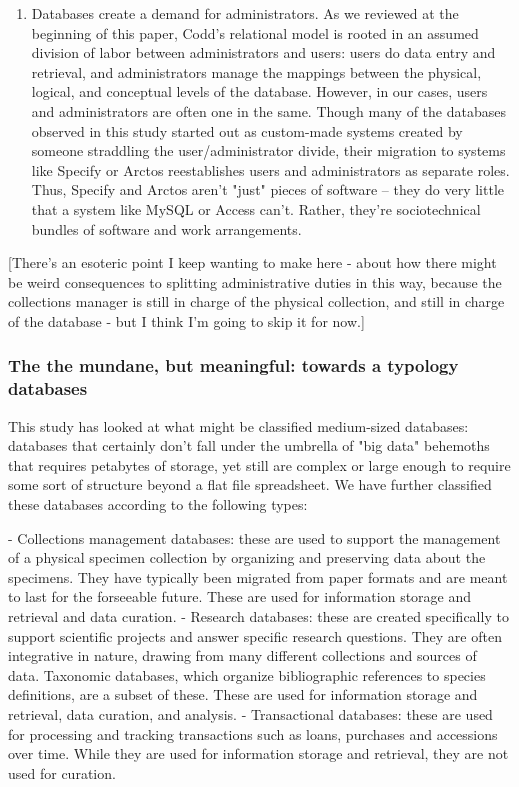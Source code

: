 \begin{enumerate}
\item Databases create a demand for administrators. As we reviewed at the beginning of this paper, Codd’s relational model is rooted in an assumed division of labor between administrators and users: users do data entry and retrieval, and administrators manage the mappings between the physical, logical, and conceptual levels of the database. However, in our cases, users and administrators are often one in the same. Though many of the databases observed in this study started out as custom-made systems created by someone straddling the user/administrator divide, their migration to systems like Specify or Arctos reestablishes users and administrators as separate roles. Thus, Specify and Arctos aren't "just" pieces of software -- they do very little that a system like MySQL or Access can't. Rather, they're sociotechnical bundles of software and work arrangements.
\end{enumerate}

[There's an esoteric point I keep wanting to make here - about how there might be weird consequences to splitting administrative duties in this way, because the collections manager is still in charge of the physical collection, and still in charge of the database - but I think I'm going to skip it for now.]

\subsubsection{The the mundane, but meaningful: towards a typology databases}

This study has looked at what might be classified medium-sized databases: databases that certainly don't fall under the umbrella of "big data" behemoths that requires petabytes of storage, yet still are complex or large enough to require some sort of structure beyond a flat file spreadsheet. We have further classified these databases according to the following types:

- Collections management databases: these are used to support the management of a physical specimen collection by organizing and preserving data about the specimens. They have typically been migrated from paper formats and are meant to last for the forseeable future. These are used for information storage and retrieval and data curation.
- Research databases: these are created specifically to support scientific projects and answer specific research questions. They are often integrative in nature, drawing from many different collections and sources of data. Taxonomic databases, which organize bibliographic references to species definitions, are a subset of these. These are used for information storage and retrieval, data curation, and analysis.
- Transactional databases: these are used for processing and tracking transactions such as loans, purchases and accessions over time. While they are used for information storage and retrieval, they are not used for curation.

